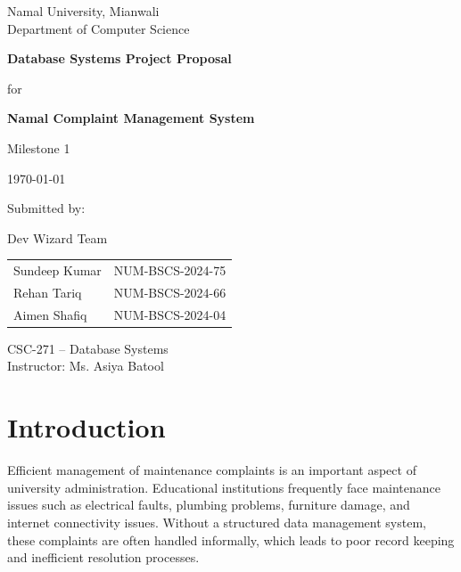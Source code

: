 \documentclass[12pt,a4paper]{article}
\begin{document}

\begin{titlepage}

\centering

\vspace*{1cm}

{\large Namal University, Mianwali\\
Department of Computer Science\\[2cm]}

{\Huge\bfseries Database Systems Project Proposal\\[0.5cm]}

{\LARGE for\\[0.5cm]}

{\Huge\bfseries Namal Complaint Management System\\[1.5cm]}

{\Large Milestone 1\\[0.3cm]}

{\large \today\\[2cm]}

{\Large Submitted by:\\[0.3cm]}

{\large Dev Wizard Team\\[0.5cm]}

\begin{tabular}{ll}
Sundeep Kumar & NUM-BSCS-2024-75 \\
Rehan Tariq & NUM-BSCS-2024-66 \\
Aimen Shafiq & NUM-BSCS-2024-04 \\
\end{tabular}

\vfill

{\large CSC-271 -- Database Systems\\[0.3cm]
Instructor: Ms. Asiya Batool}

\end{titlepage}


\tableofcontents
\newpage


\section{Introduction}

Efficient management of maintenance complaints is an important aspect of university administration. Educational institutions frequently face maintenance issues such as electrical faults, plumbing problems, furniture damage, and internet connectivity issues. Without a structured data management system, these complaints are often handled informally, which leads to poor record keeping and inefficient resolution processes.
\end{document}
